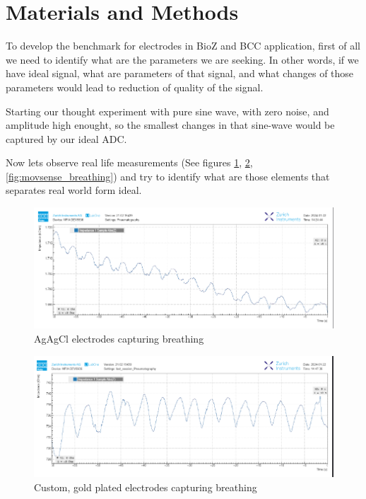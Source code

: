 \section{Materials and Methods}

To develop the benchmark for electrodes in BioZ and BCC application, first of all we need to identify what are the parameters we are seeking. In other words, if we have ideal signal, what are parameters of that signal, and what changes of those parameters would lead to reduction of quality of the signal.

Starting our thought experiment with pure sine wave, with zero noise, and amplitude high enought, so the smallest changes in that sine-wave would be captured by our ideal ADC.

Now lets observe real life measurements (See figures \ref{fig:agagcl_breathing}, \ref{fig:edigold_breathing}, \ref{fig:movsense_breathing}) and try to identify what are those elements that separates real world form ideal. 

\begin{figure}
    \centering
    \includegraphics[width=1.2\linewidth]{figures/PlaceHolders/AgAgCl_Placeholder.png}
    \caption{AgAgCl electrodes capturing breathing}
    \label{fig:agagcl_breathing}
\end{figure}

\begin{figure}
    \centering
    \includegraphics[width=1.2\linewidth]{figures/PlaceHolders/EDI_Gold_Placeholder.png}
    \caption{Custom, gold plated electrodes capturing breathing}
    \label{fig:edigold_breathing}
\end{figure}


